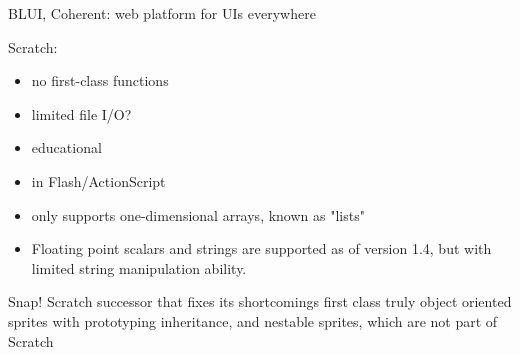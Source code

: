 BLUI, Coherent: web platform for UIs everywhere
        
   
    
Scratch:
\begin{itemize}
    \item  no first-class functions
    \item  limited file I/O?
    \item  educational
    \item  in Flash/ActionScript
    \item  only supports one-dimensional arrays, known as "lists"
    \item  Floating point scalars and strings are supported as of version 1.4, but with limited string manipulation ability.
\end{itemize}
    

Snap!
    Scratch successor that fixes its shortcomings
    first class truly object oriented sprites with prototyping inheritance, and nestable sprites, which are not part of Scratch

